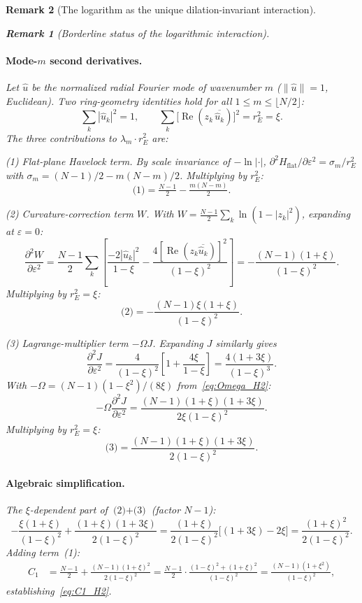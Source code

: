 \documentclass[12pt, a4paper]{article}
\newtheorem{remark}{Remark}[section]
\numberwithin{equation}{section}
\begin{document}
\begin{remark}[The logarithm as the unique dilation-invariant interaction]
\begin{remark}[Borderline status of the logarithmic interaction]
\paragraph{Mode-$m$ second derivatives.}
Let $\hat u$ be the normalized radial Fourier mode of wavenumber $m$
($\|\hat u\|=1$, Euclidean).  Two ring-geometry identities hold for all
$1 \le m \le \lfloor N/2\rfloor$:
\[
  \sum_k |\hat u_k|^2 = 1, \qquad
  \sum_k \bigl[\operatorname{Re}(z_k\,\overline{\hat u_k})\bigr]^2 = r_E^2 = \xi.
\]
The three contributions to $\lambda_m \cdot r_E^2$ are:

\emph{(1) Flat-plane Havelock term.}
By scale invariance of $-\ln|\cdot|$,
$\partial^2 H_{\mathrm{flat}}/\partial\varepsilon^2 = \sigma_m/r_E^2$
with $\sigma_m = (N-1)/2 - m(N-m)/2$.  Multiplying by $r_E^2$:
\[
  \text{(1)} = \tfrac{N-1}{2} - \tfrac{m(N-m)}{2}.
\]

\emph{(2) Curvature-correction term $W$.}
With $W = \tfrac{N-1}{2}\sum_k\ln(1-|z_k|^2)$, expanding at $\varepsilon=0$:
\[
  \frac{\partial^2 W}{\partial\varepsilon^2}
  = \frac{N-1}{2}\sum_k\!\left[
    \frac{-2|\hat u_k|^2}{1-\xi}
    - \frac{4[\operatorname{Re}(z_k\overline{\hat u_k})]^2}{(1-\xi)^2}
  \right]
  = -\frac{(N-1)(1+\xi)}{(1-\xi)^2}.
\]
Multiplying by $r_E^2 = \xi$:
\[
  \text{(2)} = -\frac{(N-1)\xi(1+\xi)}{(1-\xi)^2}.
\]

\emph{(3) Lagrange-multiplier term $-\Omega J$.}
Expanding $J$ similarly gives
\[
  \frac{\partial^2 J}{\partial\varepsilon^2}
  = \frac{4}{(1-\xi)^2}\!\left[1 + \frac{4\xi}{1-\xi}\right]
  = \frac{4(1+3\xi)}{(1-\xi)^3}.
\]
With $-\Omega = (N-1)(1-\xi^2)/(8\xi)$ from~\eqref{eq:Omega_H2}:
\[
  -\Omega\frac{\partial^2 J}{\partial\varepsilon^2}
  = \frac{(N-1)(1+\xi)(1+3\xi)}{2\xi(1-\xi)^2}.
\]
Multiplying by $r_E^2 = \xi$:
\[
  \text{(3)} = \frac{(N-1)(1+\xi)(1+3\xi)}{2(1-\xi)^2}.
\]

\paragraph{Algebraic simplification.}
The $\xi$-dependent part of $\text{(2)}+\text{(3)}$ (factor $N-1$):
\[
  -\frac{\xi(1+\xi)}{(1-\xi)^2} + \frac{(1+\xi)(1+3\xi)}{2(1-\xi)^2}
  = \frac{(1+\xi)}{2(1-\xi)^2}\bigl[(1+3\xi) - 2\xi\bigr]
  = \frac{(1+\xi)^2}{2(1-\xi)^2}.
\]
Adding term~(1):
\begin{align*}
  C_1 &= \frac{N-1}{2} + \frac{(N-1)(1+\xi)^2}{2(1-\xi)^2}
       = \frac{N-1}{2}\cdot\frac{(1-\xi)^2+(1+\xi)^2}{(1-\xi)^2}
       = \frac{(N-1)(1+\xi^2)}{(1-\xi)^2},
\end{align*}
establishing~\eqref{eq:C1_H2}.


\end{remark}
\end{remark}
\end{document}
